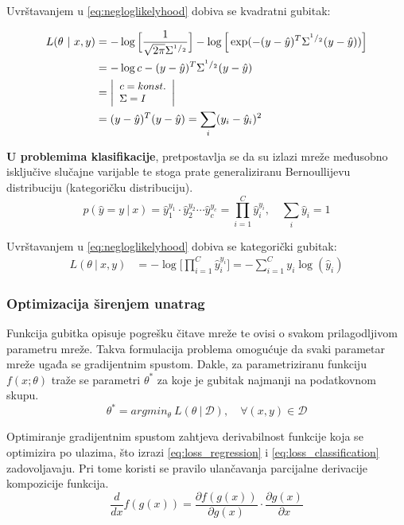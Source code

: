 \documentclass[times, utf8, numeric, diplomski]{fer}
\def\pfrac#1#2{\frac{\partial #1}{\partial #2}}
\def\dfrac#1#2{\frac{d #1}{d #2}}
\def\probsep{\ |\ }
\def\dataset{\mathcal{D}}
\begin{document}
Uvrštavanjem u \eqref{eq:negloglikelyhood} dobiva se kvadratni gubitak:

\begin{align}
\label{eq:loss_regression}
L(\theta \probsep x,y) &= - \log \Big[ \frac{1}{\sqrt{2\pi}\Sigma^{^1/_2}} \Big] - \log \Big[ \exp(-(y-\hat{y})^T\Sigma^{^1/_2}(y-\hat{y})) \Big] \nonumber \\
&= -\log c - (y-\hat{y})^T\Sigma^{^1/_2}(y-\hat{y}) \nonumber \\
&= \left|\footnotesize 
\begin{array}[c]{l} 
	c = konst. \\ 
	\Sigma = I 
\end{array}
\right| \nonumber \\
&= (y-\hat{y})^T(y-\hat{y}) = \sum_i (y_i - \hat{y}_i)^2
\end{align}

\textbf{U problemima klasifikacije}, pretpostavlja se da su izlazi mreže međusobno isključive slučajne varijable te stoga prate generaliziranu Bernoullijevu distribuciju (kategoričku distribuciju).
\begin{equation}
p(\hat{y}=y \probsep x) = \hat{y}_1^{y_1} \cdot \hat{y}_2^{y_2} \cdots \hat{y}_c^{y_c} 
= \prod_{i=1}^C \hat{y}_i^{y_i}, \quad \sum_i \hat{y}_i = 1
\end{equation}

Uvrštavanjem u \ref{eq:negloglikelyhood} dobiva se kategorički gubitak:
\begin{align}
\label{eq:loss_classification}
L(\theta \probsep x,y) &= - \log \Big[ \prod_{i=1}^C \hat{y}_i^{y_i} \Big] = - \sum_{i=1}^C y_i \log (\hat{y}_i)
\end{align}

\subsubsection{Optimizacija širenjem unatrag}
\label{sec:backprop}
Funkcija gubitka opisuje pogrešku čitave mreže te ovisi o svakom prilagodljivom parametru mreže. Takva formulacija problema omogućuje da svaki parametar mreže ugađa se gradijentnim spustom. Dakle, za parametriziranu funkciju $f(x;\theta)$ traže se parametri $\theta^*$ za koje je gubitak najmanji na podatkovnom skupu.
\begin{equation}
\theta^* = argmin_\theta\ L(\theta \probsep \dataset), \quad \forall (x,y) \in \dataset
\end{equation}

Optimiranje gradijentnim spustom zahtjeva derivabilnost funkcije koja se optimizira po ulazima, što izrazi \eqref{eq:loss_regression} i \eqref{eq:loss_classification} zadovoljavaju. Pri tome koristi se pravilo ulančavanja parcijalne derivacije kompozicije funkcija.
\begin{equation}
\label{eq:partial_rule}
\dfrac{}{x} f(g(x)) = \pfrac{f(g(x))}{g(x)} \cdot \pfrac{g(x)}{x}
\end{equation}
\end{document}
